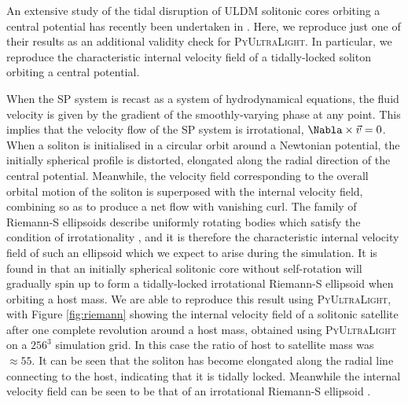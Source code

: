 \documentclass[a4paper,11pt]{article}
\newcommand{\PyUltraLight}{\textsc{PyUltraLight}\xspace}
\begin{document}
An extensive study of the tidal disruption of ULDM solitonic cores orbiting a central potential has recently been undertaken in \cite{Du2018}. Here, we reproduce just one of their results as an additional validity check for \PyUltraLight. In particular, we reproduce the characteristic internal velocity field of a tidally-locked soliton orbiting a central potential. 

When the SP system is recast as a system of hydrodynamical equations, the fluid velocity is given by the gradient of the smoothly-varying phase at any point. This implies that the velocity flow of the SP system is irrotational, $\Nabla\times\vec{v}=0$. When a soliton is initialised in a circular orbit around a Newtonian potential, the initially spherical profile is distorted, elongated along the radial direction of the central potential. Meanwhile, the velocity field corresponding to the overall orbital motion of the soliton is superposed with the internal velocity field, combining so as to produce a net flow with vanishing curl. The family of Riemann-S ellipsoids describe uniformly rotating bodies which satisfy the condition of irrotationality \cite{Chandrasekhar1965}, and it is therefore the characteristic internal velocity field of such an ellipsoid which we expect to arise during the simulation. It is found in \cite{Du2018} that an initially spherical solitonic core without self-rotation will gradually spin up to form a tidally-locked irrotational Riemann-S ellipsoid when orbiting a host mass. We are able to reproduce this result using \PyUltraLight, with Figure \ref{fig:riemann} showing the internal velocity field of a solitonic satellite after one complete revolution around a host mass, obtained using \PyUltraLight on a $256^3$ simulation grid. In this case the ratio of host to satellite mass was $\approx 55$. It can be seen that the soliton has become elongated along the radial line connecting to the host, indicating that it is tidally locked. Meanwhile the internal velocity field can be seen to be that of an irrotational Riemann-S ellipsoid \cite{Daller2012}.
\end{document}

